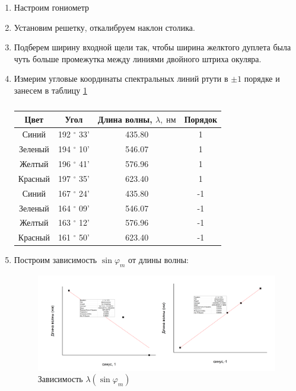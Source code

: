 \documentclass[a4paper,12pt]{article}
\renewcommand{\phi}{\ensuremath{\varphi}}
\theoremstyle{plain} %
\theoremstyle{definition} %
\theoremstyle{remark} %
\begin{document}
\begin{enumerate}
	\item Настроим гониометр
	\item Установим решетку, откалибруем наклон столика.
	\item Подберем ширину входной щели так, чтобы ширина желктого дуплета была чуть больше промежутка между линиями двойного штриха окуляра.
	\item Измерим угловые координаты спектральных линий ртути в $\pm 1$ порядке и занесем в таблицу \ref{t1}
	
	\begin{table}[h!]
		\begin{center}
			\begin{tabular}{|c|c|c|c|}
				\hline
				Цвет & Угол & Длина волны, $\lambda, \; нм$ & Порядок \\ \hline 
				Синий & 192 $^{\circ}$ 33'&435.80& 1\\ \hline
				Зеленый & 194 $^{\circ}$ 10' & 546.07 & 1 \\\hline
				Желтый & 196 $^{\circ}$ 41' &576.96 & 1 \\ \hline
				Красный & 197 $^{\circ}$ 35' & 623.40 & 1\\ \hline
				Синий & 167 $^{\circ}$ 24' & 435.80 & -1 \\ \hline 
				Зеленый & 164 $^{\circ}$ 09' & 546.07 & -1 \\\hline
				Желтый & 163 $^{\circ}$ 12' &576.96 & -1 \\ \hline
				Красный & 161 $^{\circ}$ 50' & 623.40 & -1\\ \hline
				
			\end{tabular}
			\caption{}
			\label{t1}
		\end{center}
	\end{table}
	
	\item Построим зависимость $\sin{\varphi_m}$ от длины волны:
	\begin{figure}[h!]
		\begin{center}
			\includegraphics[scale = 0.3]{228.png}
			\caption{Зависимость $\lambda(\sin \phi_m)$}
			\label{p1}
		\end{center}
	\end{figure}


\end{enumerate}
\end{document}
